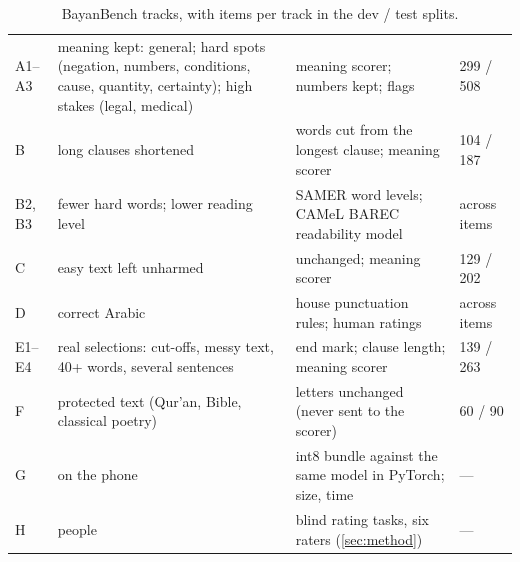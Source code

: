 \documentclass[10pt,a4paper]{article}
\begin{document}
\begin{table}[h]
\small
\caption{BayanBench tracks, with items per track in the dev / test splits.}
\label{tab:tracks}
\begin{tabularx}{\linewidth}{|C{8mm}|p{34mm}|L|C{16mm}|}
\hline
{} &  &  &  \\ \hline
A1--A3 & meaning kept: general; hard spots (negation, numbers, conditions, cause, quantity, certainty); high stakes (legal, medical) & meaning scorer; numbers kept; flags & 299 / 508 \\ \hline
B & long clauses shortened & words cut from the longest clause; meaning scorer & 104 / 187 \\ \hline
B2, B3 & fewer hard words; lower reading level & SAMER word levels; CAMeL BAREC readability model & across items \\ \hline
C & easy text left unharmed & unchanged; meaning scorer & 129 / 202 \\ \hline
D & correct Arabic & house punctuation rules; human ratings & across items \\ \hline
E1--E4 & real selections: cut-offs, messy text, 40+ words, several sentences & end mark; clause length; meaning scorer & 139 / 263 \\ \hline
F & protected text (Qur'an, Bible, classical poetry) & letters unchanged (never sent to the scorer) & 60 / 90 \\ \hline
G & on the phone & int8 bundle against the same model in PyTorch; size, time & --- \\ \hline
H & people & \hTasks{} blind rating tasks, six raters (\autoref{sec:method}) & --- \\ \hline
\end{tabularx}
\end{table}
\end{document}
